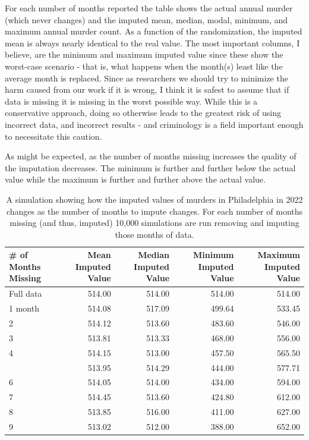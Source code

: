 \documentclass[
  12pt,
  openany]{book}
\begin{document}
For each number of months reported the table shows the actual annual murder (which never changes) and the imputed mean, median, modal, minimum, and maximum annual murder count. As a function of the randomization, the imputed mean is always nearly identical to the real value. The most important columns, I believe, are the minimum and maximum imputed value since these show the worst-case scenario - that is, what happens when the month(s) least like the average month is replaced. Since as researchers we should try to minimize the harm caused from our work if it is wrong, I think it is safest to assume that if data is missing it is missing in the worst possible way. While this is a conservative approach, doing so otherwise leads to the greatest risk of using incorrect data, and incorrect results - and criminology is a field important enough to necessitate this caution.

As might be expected, as the number of months missing increases the quality of the imputation decreases. The minimum is further and further below the actual value while the maximum is further and further above the actual value.

\begin{longtable}[t]{lrrrr}
\caption{\label{tab:countyPhillyMurderMonthsMissing}A simulation showing how the imputed values of murders in Philadelphia in 2022 changes as the number of months to impute changes. For each number of months missing (and thus, imputed) 10,000 simulations are run removing and imputing those months of data.}\\
\toprule
\# of Months Missing & Mean Imputed Value & Median Imputed Value & Minimum Imputed Value & Maximum Imputed Value\\
\midrule
Full data & 514.00 & 514.00 & 514.00 & 514.00\\
1 month & 514.08 & 517.09 & 499.64 & 533.45\\
2 & 514.12 & 513.60 & 483.60 & 546.00\\
3 & 513.81 & 513.33 & 468.00 & 556.00\\
4 & 514.15 & 513.00 & 457.50 & 565.50\\
\addlinespace
5 & 513.95 & 514.29 & 444.00 & 577.71\\
6 & 514.05 & 514.00 & 434.00 & 594.00\\
7 & 514.45 & 513.60 & 424.80 & 612.00\\
8 & 513.85 & 516.00 & 411.00 & 627.00\\
9 & 513.02 & 512.00 & 388.00 & 652.00\\
\bottomrule
\end{longtable}
\end{document}
